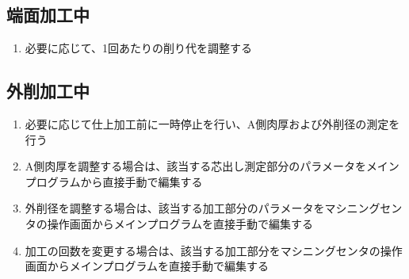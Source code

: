 \subsection{端面加工中}
\begin{enumerate}
\item 必要に応じて、1回あたりの削り代を調整する
\end{enumerate}


\subsection{外削加工中}
\begin{enumerate}
\item 必要に応じて仕上加工前に一時停止を行い、A側肉厚および外削径の測定を行う
\item A側肉厚を調整する場合は、該当する芯出し測定部分のパラメータをメインプログラムから直接手動で編集する
\item {}外削径を調整する場合は、該当する加工部分のパラメータをマシニングセンタの操作画面からメインプログラムを直接手動で編集する
\item {}加工の回数を変更する場合は、該当する加工部分をマシニングセンタの操作画面からメインプログラムを直接手動で編集する
\end{enumerate}


